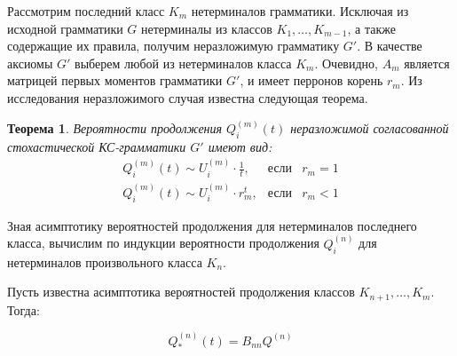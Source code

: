 \documentclass[12pt]{article}
\newtheorem{theorem}{Теорема}
\begin{document}
Рассмотрим последний класс $K_m$ нетерминалов грамматики. Исключая из исходной грамматики $G$ нетерминалы из классов $K_1, \ldots, K_{m-1}$, а также содержащие их правила, получим неразложимую грамматику $G'$. В качестве аксиомы $G'$ выберем любой из нетерминалов класса $K_m$. Очевидно, $A_m$ является матрицей первых моментов грамматики $G'$, и имеет перронов корень $r_m$. Из исследования неразложимого случая известна следующая теорема.

\begin{theorem}
	Вероятности продолжения $Q^{(m)}_i(t)$ неразложимой согласованной стохастической КС-грамматики $G'$ имеют вид:
	\begin{equation}
	\begin{array}{lll}
		Q^{(m)}_i(t) \sim U^{(m)}_i \cdot \frac{1}{t}, & \text{если} & r_m = 1 \\
		Q^{(m)}_i(t) \sim U^{(m)}_i \cdot r_m^t, & \text{если} & r_m < 1
	\end{array}
	\end{equation}
\end{theorem}

Зная асимптотику вероятностей продолжения для нетерминалов последнего класса, вычислим по индукции вероятности продолжения $Q^{(n)}_i$ для нетерминалов произвольного класса $K_n$.

Пусть известна асимптотика вероятностей продолжения классов $K_{n+1}, \ldots, K_m$. Тогда:

\begin{equation}
	Q^{(n)}_*(t) = B_{nn}Q^{(n)}
\end{equation}
\end{document}
